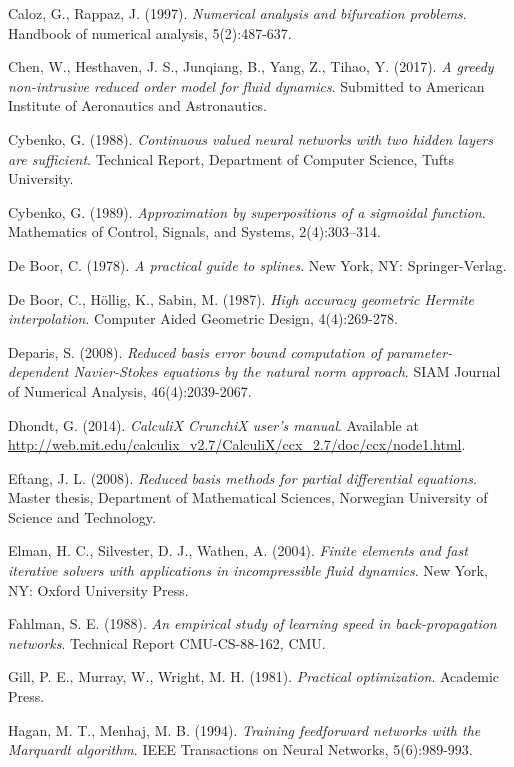 \documentclass[12pt, a4paper, twoside, openright, notitlepage]{report}
\numberwithin{equation}{chapter}
\theoremstyle{theorem}
\theoremstyle{definition}
\theoremstyle{remark}
\theoremstyle{proposition}
\numberwithin{figure}{chapter}
\begin{document}
\begin{thebibliography}{50}
		Caloz, G., Rappaz, J. (1997). \emph{Numerical analysis and bifurcation problems}. Handbook of numerical analysis, 5(2):487-637.
		
		Chen, W., Hesthaven, J. S., Junqiang, B., Yang, Z., Tihao, Y. (2017). \emph{A greedy non-intrusive reduced order model for fluid dynamics}. Submitted to American Institute of Aeronautics and Astronautics.
	
		Cybenko, G. (1988). \emph{Continuous valued neural networks with two hidden layers are sufficient}. Technical Report, Department of Computer Science, Tufts University.
		
		Cybenko, G. (1989). \emph{Approximation by superpositions of a sigmoidal function}. Mathematics of Control, Signals, and Systems, 2(4):303–314.
		
		De Boor, C. (1978). \emph{A practical guide to splines}. New York, NY: Springer-Verlag.
		
		De Boor, C., H\"{o}llig, K., Sabin, M. (1987). \emph{High accuracy geometric Hermite interpolation}. Computer Aided Geometric Design, 4(4):269-278.
		
		Deparis, S. (2008). \emph{Reduced basis error bound computation of parameter-dependent Navier-Stokes equations by the natural norm approach}. SIAM Journal of Numerical Analysis, 46(4):2039-2067.
		
		Dhondt, G. (2014). \emph{CalculiX CrunchiX user's manual}. Available at \url{http://web.mit.edu/calculix_v2.7/CalculiX/ccx_2.7/doc/ccx/node1.html}.
		
		Eftang, J. L. (2008). \emph{Reduced basis methods for partial differential equations}. Master thesis, Department of Mathematical Sciences, Norwegian University of Science and Technology.
		
		Elman, H. C., Silvester, D. J., Wathen, A. (2004). \emph{Finite elements and fast iterative solvers with applications in incompressible fluid dynamics}. New York, NY: Oxford University Press.
		
		Fahlman, S. E. (1988). \emph{An empirical study of learning speed in back-propagation networks}. Technical Report CMU-CS-88-162, CMU.
		
		Gill, P. E., Murray, W., Wright, M. H. (1981). \emph{Practical optimization}. Academic Press.
		
		Hagan, M. T., Menhaj, M. B. (1994). \emph{Training feedforward networks with the Marquardt algorithm}. IEEE Transactions on Neural Networks, 5(6):989-993.
		

\end{thebibliography}
\end{document}
